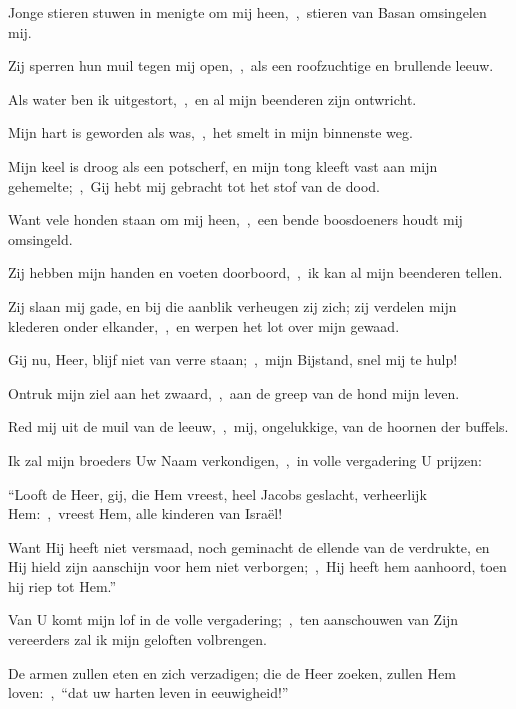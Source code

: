 \documentclass[12pt,twoside,a5paper]{article}
\begin{document}
\begin{halfparskip}
  Jonge stieren stuwen in menigte om mij heen,~\sep\ stieren van Basan omsingelen mij.

  Zij sperren hun muil tegen mij open,~\sep\ als een roofzuchtige en brullende leeuw.

  Als water ben ik uitgestort,~\sep\ en al mijn beenderen zijn ontwricht.

  Mijn hart is geworden als was,~\sep\ het smelt in mijn binnenste weg.

  Mijn keel is droog als een potscherf, en mijn tong kleeft vast aan mijn gehemelte;~\sep\ Gij hebt mij gebracht tot het stof van de dood.

  Want vele honden staan om mij heen,~\sep\ een bende boosdoeners houdt mij omsingeld.

  Zij hebben mijn handen en voeten doorboord,~\sep\ ik kan al mijn beenderen tellen.

  Zij slaan mij gade, en bij die aanblik verheugen zij zich; zij verdelen mijn klederen onder elkander,~\sep\ en werpen het lot over mijn gewaad.
\end{halfparskip}


\begin{halfparskip}
  Gij nu, Heer, blijf niet van verre staan;~\sep\ mijn Bijstand, snel mij te hulp!

  Ontruk mijn ziel aan het zwaard,~\sep\ aan de greep van de hond mijn leven.

  Red mij uit de muil van de leeuw,~\sep\ mij, ongelukkige, van de hoornen der buffels.
\end{halfparskip}


\begin{halfparskip}
  Ik zal mijn broeders Uw Naam verkondigen,~\sep\ in volle vergadering U prijzen:

  ``Looft de Heer, gij, die Hem vreest, heel Jacobs geslacht, verheerlijk Hem:~\sep\ vreest Hem, alle kinderen van Israël!

  Want Hij heeft niet versmaad, noch geminacht de ellende van de verdrukte, en Hij hield zijn aanschijn voor hem niet verborgen;~\sep\ Hij heeft hem aanhoord, toen hij riep tot Hem.''

  Van U komt mijn lof in de volle vergadering;~\sep\ ten aanschouwen van Zijn vereerders zal ik mijn geloften volbrengen.

  De armen zullen eten en zich verzadigen; die de Heer zoeken, zullen Hem loven:~\sep\ ``dat uw harten leven in eeuwigheid!''
\end{halfparskip}
\end{document}
